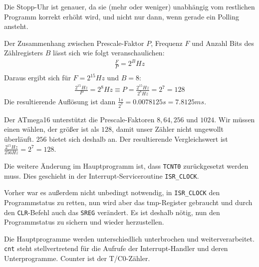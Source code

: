 \documentclass{CInf_practice}
\begin{document}


Die Stopp-Uhr ist genauer, da sie (mehr oder weniger) unabhängig vom 
restlichen Programm korrekt erhöht wird, und nicht nur dann, wenn gerade ein 
Polling ansteht.

Der Zusammenhang zwischen Prescale-Faktor $P$, Frequenz $F$ und Anzahl Bits 
des Zählregisters $B$ lässt sich wie folgt veranschaulichen:
\begin{align*}
\frac{F}{P} = 2^B Hz\\
\end{align*}
Daraus ergibt sich für $F = 2^{15} Hz$ und $B = 8$:
\begin{align*}
\frac{2^{15} Hz}{P} = 2^8 Hz \equiv P = \frac{2^{15} Hz}{2^8 Hz} = 2^7 = 128
\end{align*}
Die resultierende Auflösung ist dann $\frac{1 s}{2^7} = 0.0078125 s = 7.8125 ms$.

Der ATmega16 unterstützt die Prescale-Faktoren $8, 64, 256$ und $1024$. Wir 
müssen einen wählen, der größer ist als $128$, damit unser Zähler nicht 
ungewollt überläuft. $256$ bietet sich deshalb an. Der resultierende 
Vergleichswert ist $\frac{2^{15} Hz}{256 Hz} = 2^7 = 128$.

Die weitere Änderung im Hauptprogramm ist, dass \texttt{TCNT0} zurückgesetzt
werden muss. Dies geschieht in der Interrupt-Serviceroutine \texttt{ISR\_CLOCK}.

Vorher war es außerdem nicht unbedingt notwendig, in \texttt{ISR\_CLOCK} den 
Programmstatus zu retten, nun wird aber das tmp-Register gebraucht und durch
den \texttt{CLR}-Befehl auch das \texttt{SREG} verändert. Es ist deshalb nötig,
nun den Programmstatus zu sichern und wieder herzustellen.



Die Hauptprogramme werden unterschiedlich unterbrochen und weiterverarbeitet.
\texttt{cnt} steht stellvertretend für die Aufrufe der Interrupt-Handler und 
deren Unterprogramme.
Counter ist der T/C0-Zähler.
\end{document}
